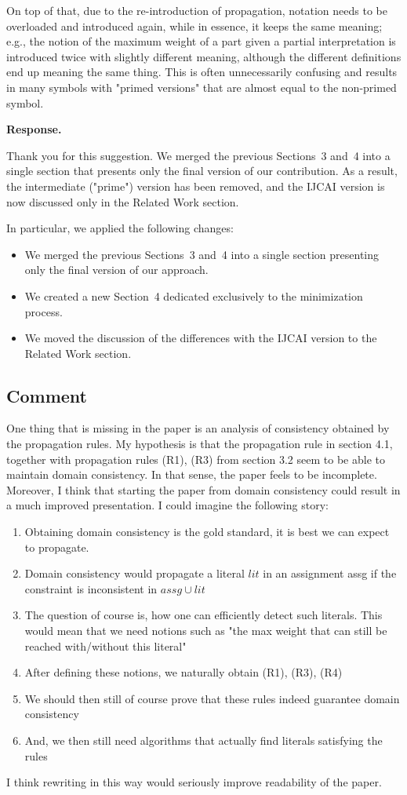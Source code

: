 \documentclass[11pt]{article}
\theoremstyle{definition}
\newcommand{\revieweranswered}{\subsection{Comment}}
\newenvironment{response}{
    \color{blue} \textbf{Response.}
}{
}
\begin{document}
On top of that, due to the re-introduction of propagation, notation needs to be overloaded and introduced again, while in essence, it keeps the same meaning; e.g., the notion of the maximum weight of a part given a partial interpretation is introduced twice with slightly different meaning, although the different definitions end up meaning the same thing. This is often unnecessarily confusing and results in many symbols with "primed versions" that are almost equal to the non-primed symbol.



\begin{response}
Thank you for this suggestion.
We merged the previous Sections~3 and~4 into a single section that presents only the final version of our contribution. As a result, the intermediate ("prime") version has been removed, and the IJCAI version is now discussed only in the Related Work section.

In particular, we applied the following changes:
\begin{itemize}
    \item We merged the previous Sections~3 and~4 into a single section presenting only the final version of our approach.
    \item We created a new Section~4 dedicated exclusively to the minimization process.
    \item We moved the discussion of the differences with the IJCAI version to the Related Work section.
\end{itemize}
\end{response}

\vspace{0.5cm}
\revieweranswered
One thing that is missing in the paper is an analysis of consistency obtained by the propagation rules.
My hypothesis is that the propagation rule in section 4.1, together with propagation rules (R1), (R3) from section 3.2 seem to be able to maintain domain consistency.
In that sense, the paper feels to be incomplete.
Moreover, I think that starting the paper from domain consistency could result in a much improved presentation.
I could imagine the following story:
\begin{enumerate}
    \item  Obtaining domain consistency is the gold standard, it is best we can expect to propagate.
    \item  Domain consistency would propagate a literal $lit$ in an assignment assg if the constraint is inconsistent in $ assg \cup lit$
    \item The question of course is, how one can efficiently detect such literals. This would mean that we need notions such as "the max weight that can still be reached with/without this literal"
    \item After defining these notions, we naturally obtain (R1), (R3), (R4)
    \item We should then still of course prove that these rules indeed guarantee domain consistency
    \item And, we then still need algorithms that actually find literals satisfying the rules
\end{enumerate}
I think rewriting in this way would seriously improve readability of the paper.
\end{document}
